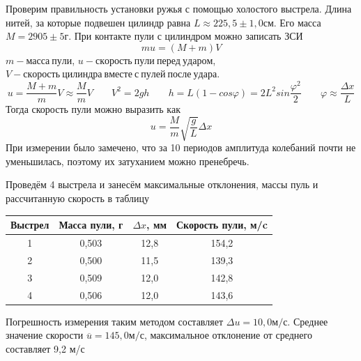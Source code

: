 \documentclass[a4paper, 12pt]{article}
\begin{document}
			Проверим правильность установки ружья с помощью холостого выстрела. Длина нитей, за которые подвешен цилиндр равна $L \approx 225,5 \pm 1,0 см$. Его масса $M=2905 \pm 5 г$. При контакте пули с цилиндром можно записать ЗСИ
			$$ mu = (M+m)V $$
			$m-масса\: пули$, $u-скорость\: пули\: перед\: ударом$, $V-скорость\: цилиндра\: вместе\: с\: пулей\: после\: удара$.
			$$ u=\frac{M+m}{m}V \approx \frac{M}{m}V \;\;\;\;\;\;\; V^2=2gh \;\;\;\;\;\;\; h = L(1-cos \varphi ) = 2L^2 sin \frac{\varphi^2}{2} \;\;\;\;\;\;\; \varphi \approx \frac{\Delta x}{L} $$
			Тогда скорость пули можно выразить как
			$$ u=\frac{M}{m} \sqrt{\frac{g}{L}} \Delta x $$
			При измерении было замечено, что за 10 периодов амплитуда колебаний почти не уменьшилась, поэтому их затуханием можно пренебречь.
			
			Проведём 4 выстрела и занесём максимальные отклонения, массы пуль и рассчитанную скорость в таблицу
			\begin{longtable}{|c|c|c|c|}
				\hline
				Выстрел & Масса пули, г & $\Delta x$, мм & Скорость пули, м/c\\
				\hline
				1 & 0,503 & 12,8 & 154,2\\
				\hline
				2 & 0,500 & 11,5 & 139,3\\
				\hline
				3 & 0,509 & 12,0 & 142,8\\
				\hline
				4 & 0,506 & 12,0 & 143,6\\
				\hline
			\end{longtable}
			Погрешность измерения таким методом составляет $\Delta u = 10,0 м/с$.
			Среднее значение скорости $\overline{u}=145,0 м/с$, максимальное отклонение от среднего составляет 9,2 м/с
\end{document}
